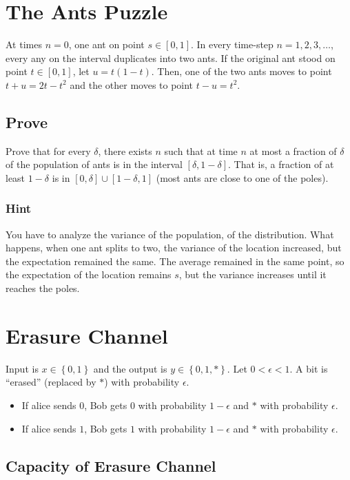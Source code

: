 \documentclass{article}
\begin{document}
\section{The Ants Puzzle}

At times $n=0$, one ant on point $s\in\left[0,1\right]$. In every time-step $n=1,2,3,\ldots$, every any on the interval duplicates into two ants. If the original ant stood on point $t\in\left[0,1\right]$, let $u=t(1-t)$. Then, one of the two ants moves to point $t+u=2t-t^2$ and the other moves to point $t-u=t^2$.

\subsection{Prove}

Prove that for every $\delta$, there exists $n$ such that at time $n$ at most a fraction of $\delta$ of the population of ants is in the interval $\left[\delta,1-\delta\right]$. That is, a fraction of at least $1-\delta$ is in $\left[0,\delta\right]\cup\left[1-\delta,1\right]$ (most ants are close to one of the poles).

\subsubsection{Hint}
You have to analyze the variance of the population, of the distribution. What happens, when one ant splits to two, the variance of the location increased, but the expectation remained the same. The average remained in the same point, so the expectation of the location remains $s$, but the variance increases until it reaches the poles.

\section{Erasure Channel}

Input is $x\in\left\{0,1\right\}$ and the output is $y\in\left\{0,1,\ast\right\}$. Let $0<\epsilon<1$. A bit is ``erased'' (replaced by $\ast$) with probability $\epsilon$.
\begin{itemize}
    \item If alice sends $0$, Bob gets $0$ with probability $1-\epsilon$ and $\ast$ with probability $\epsilon$.
    \item If alice sends $1$, Bob gets $1$ with probability $1-\epsilon$ and $\ast$ with probability $\epsilon$.
\end{itemize}

\subsection{Capacity of Erasure Channel}
\end{document}
